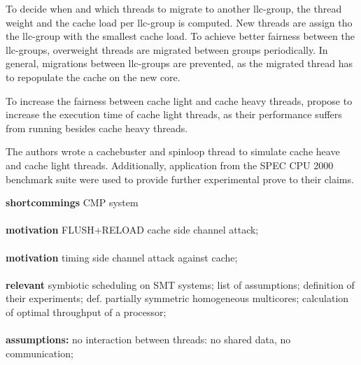 To decide when and which threads to migrate to another \gls{llc}-group, the
thread weight and the cache load per \gls{llc}-group is computed.
New threads are assign tho the \gls{llc}-group with the smallest cache load.
To achieve better fairness between the \gls{llc}-groups, overweight threads are
migrated between groups periodically.
In general, migrations between \gls{llc}-groups are prevented, as the migrated
thread has to repopulate the cache on the new core.

To increase the fairness between cache light and cache heavy threads,
\citeauthor{knauerhase_using_2008} propose to increase the execution time of
cache light threads, as their performance suffers from running besides cache
heavy threads.

The authors wrote a cachebuster and spinloop thread to simulate cache heave and
cache light threads. Additionally, application from the SPEC CPU 2000 benchmark
suite were used to provide further experimental prove to their claims.

\textbf{ shortcommings } CMP system


\paragraph{ \cite{yarom_recovering_2014} }
\textbf{motivation} FLUSH+RELOAD cache side channel attack;

\paragraph{ \cite{bernstein_cache-timing_2005} }
\textbf{motivation} timing side channel attack against cache;


\paragraph{ \cite{eyerman_revisiting_2015} }
\textbf{relevant} symbiotic scheduling on SMT systems;
list of assumptions;
definition of their experiments;
def. partially symmetric homogeneous multicores;
calculation of optimal throughput of a processor;


\paragraph{ \cite{fedorova_managing_2010} }
\textbf{assumptions:} no interaction between threads: no shared data, no
communication;

